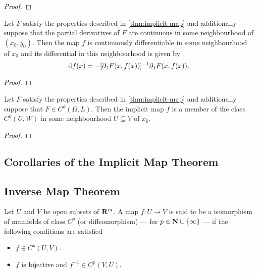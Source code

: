 \begin{proof}

\end{proof}

\begin{lemma}
  \label{lem:continuous-diff-implicit-map}
  Let \(F\) satisfy the properties described in \cref{thm:implicit-map} and
  additionally suppose that the partial derivatives of \(F\) are continuous in
  some neighbourhood of \((x_0, y_0)\). Then the map \(f\) is continuously
  differentiable in some neighbourhood of \(x_0\) and its differential in this
  neighbourhood is given by
  \[
    \mathrm{d} f(x) = - [\partial_1F(x, f(x))]^{-1} \partial_1F(x, f(x)).
  \]
\end{lemma}

\begin{proof}

\end{proof}

\begin{lemma}
  \label{lem:Ck-implicit-map}
  Let \(F\) satisfy the properties described in \cref{thm:implicit-map} and
  additionally suppose that \(F \in C^k(\Omega, L)\). Then the implicit map \(f\) is
  a member of the class \(C^k(U, W)\) in some neighbourhood \(U \subseteq V\) of \(x_0\).
\end{lemma}

\begin{proof}

\end{proof}


\subsection{Corollaries of the Implicit Map Theorem}

\subsection{Inverse Map Theorem}

\begin{definition}[Diffeomorphisms]
  \label{def:diffeormorphism-on-R}
  Let \(U\) and \(V\) be open subsets of \(\mathbf{R}^m\). A map \(f: U \to V\) is said to
  be a isomorphism of manifolds of class \(C^p\) (or diffeomorphism) --- for \(p \in
  \mathbf{N} \cup \{\infty\}\) --- if the following conditions are satisfied
  \begin{itemize}\setlength\itemsep{0em}
    \item \(f \in C^p(U, V)\).
    \item \(f\) is bijective and \(f^{-1} \in C^p(V, U)\).
  \end{itemize}
\end{definition}

